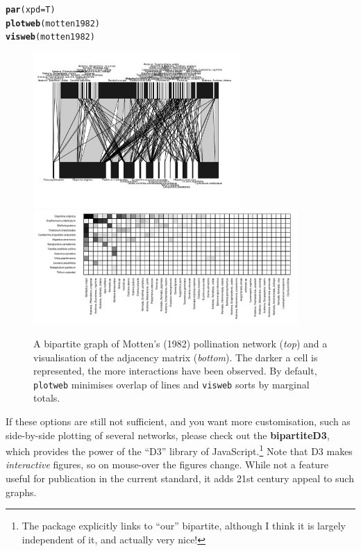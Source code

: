 \documentclass[a4paper, 11pt]{article}\usepackage[]{graphicx}\usepackage[dvipsnames]{xcolor}
\makeatletter
\newcommand{\hlstd}[1]{\textcolor[rgb]{0.345,0.345,0.345}{#1}}%
\newcommand{\hlkwc}[1]{\textcolor[rgb]{0.333,0.667,0.333}{#1}}%
\newcommand{\hlkwd}[1]{\textcolor[rgb]{0.737,0.353,0.396}{\textbf{#1}}}%
\newenvironment{kframe}{%
 \def\at@end@of@kframe{}%
 \ifinner\ifhmode%
  \def\at@end@of@kframe{\end{minipage}}%
  \begin{minipage}{\columnwidth}%
 \fi\fi%
 \def\FrameCommand##1{\hskip\@totalleftmargin \hskip-\fboxsep
 \colorbox{shadecolor}{##1}\hskip-\fboxsep
     \hskip-\linewidth \hskip-\@totalleftmargin \hskip\columnwidth}%
 \MakeFramed {\advance\hsize-\width
   \@totalleftmargin\z@ \linewidth\hsize
   \@setminipage}}%
 {\par\unskip\endMakeFramed%
 \at@end@of@kframe}
\newenvironment{knitrout}{}{} %
\newcommand{\package}[1]{\textbf{#1}}
\makeatother
\begin{document}
\begin{knitrout}
\color{fgcolor}\begin{kframe}
\begin{alltt}
\hlkwd{par}\hlstd{(}\hlkwc{xpd}\hlstd{=T)}
\hlkwd{plotweb}\hlstd{(motten1982)}
\hlkwd{visweb}\hlstd{(motten1982)}
\end{alltt}
\end{kframe}
\end{knitrout}
%
%
\begin{figure}
\centering
	\includegraphics[width=0.7\textwidth]{figures/motten1982_plotweb}
	\smallskip
	\includegraphics[width=0.9\textwidth]{figures/motten1982_visweb}
	\caption{A bipartite graph of Motten's (1982) pollination network (\emph{top}) and a visualisation of the adjacency matrix (\emph{bottom}). The darker a cell is represented, the more interactions have been observed. By default, \texttt{plotweb} minimises overlap of lines and \texttt{visweb} sorts by marginal totals.}
	\label{fig:Amotten}
\end{figure}

If these options are still not sufficient, and you want more customisation, such as side-by-side plotting of several networks, please check out the \package{bipartiteD3}, which provides the power of the ``D3'' library of JavaScript.\footnote{The package explicitly links to ``our'' bipartite, although I think it is largely independent of it, and actually very nice!} Note that D3 makes \emph{interactive} figures, so on mouse-over the figures change. While not a feature useful for publication in the current standard, it adds 21st century appeal to such graphs.
\end{document}
